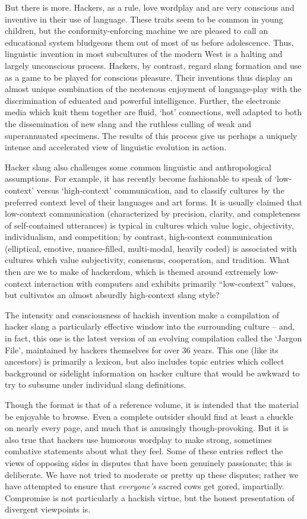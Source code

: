 But there is more. Hackers, as a rule, love wordplay and are very conscious and
inventive in their use of language. These traits seem to be common in young
children, but the conformity-enforcing machine we are pleased to call an
educational system bludgeons them out of most of us before adolescence. Thus,
linguistic invention in most subcultures of the modern West is a halting and
largely unconscious process. Hackers, by contrast, regard slang formation and
use as a game to be played for conscious pleasure. Their inventions thus display
an almost unique combination of the neotenous enjoyment of language-play with
the discrimination of educated and powerful intelligence. Further, the
electronic media which knit them together are fluid, `hot' connections, well
adapted to both the dissemination of new slang and the ruthless culling of weak
and superannuated specimens. The results of this process give us perhaps a
uniquely intense and accelerated view of linguistic evolution in action.

Hacker slang also challenges some common linguistic and anthropological
assumptions. For example, it has recently become fashionable to speak of
`low-context' versus `high-context' communication, and to classify cultures by
the preferred context level of their languages and art forms. It is usually
claimed that low-context communication (characterized by precision, clarity, and
completeness of self-contained utterances) is typical in cultures which value
logic, objectivity, individualism, and competition; by contrast, high-context
communication (elliptical, emotive, nuance-filled, multi-modal, heavily coded)
is associated with cultures which value subjectivity, consensus, cooperation,
and tradition. What then are we to make of hackerdom, which is themed around
extremely low-context interaction with computers and exhibits primarily
``low-context'' values, but cultivates an almost absurdly high-context slang
style?

The intensity and consciousness of hackish invention make a compilation of
hacker slang a particularly effective window into the surrounding culture --
and, in fact, this one is the latest version of an evolving compilation called
the `Jargon File', maintained by hackers themselves for over 36 years. This one
(like its ancestors) is primarily a lexicon, but also includes topic entries
which collect background or sidelight information on hacker culture that would
be awkward to try to subsume under individual slang definitions.

Though the format is that of a reference volume, it is intended that the
material be enjoyable to browse. Even a complete outsider should find at least a
chuckle on nearly every page, and much that is amusingly though-provoking. But
it is also true that hackers use humorous wordplay to make strong, sometimes
combative statements about what they feel. Some of these entries reflect the
views of opposing sides in disputes that have been genuinely passionate; this is
deliberate. We have not tried to moderate or pretty up these disputes; rather we
have attempted to ensure that \textit{everyone's} sacred cows get gored,
impartially. Compromise is not particularly a hackish virtue, but the honest
presentation of divergent viewpoints is.

